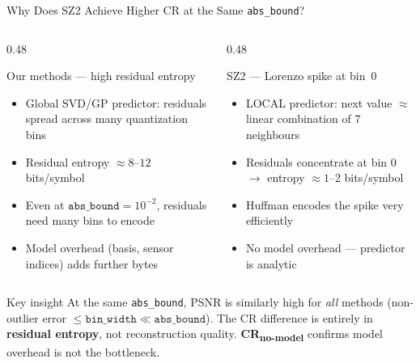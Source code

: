 \documentclass[aspectratio=169, 11pt]{beamer}
\begin{document}
\begin{frame}{Why Does SZ2 Achieve Higher CR at the Same \texttt{abs\_bound}?}
\begin{columns}[T]

\begin{column}{0.48\textwidth}
  \begingroup
  \begin{block}{Our methods — high residual entropy}
    \scriptsize
    \begin{itemize}\setlength\itemsep{0.2em}
      \item Global SVD/GP predictor: residuals spread across many quantization bins
      \item Residual entropy $\approx 8$–$12$ bits/symbol
      \item Even at $\texttt{abs\_bound}=10^{-2}$, residuals need many bins to encode
      \item Model overhead (basis, sensor indices) adds further bytes
    \end{itemize}
  \end{block}
  \endgroup
\end{column}

\begin{column}{0.48\textwidth}
  \begingroup
  \begin{block}{SZ2 — Lorenzo spike at bin~0}
    \scriptsize
    \begin{itemize}\setlength\itemsep{0.2em}
      \item LOCAL predictor: next value $\approx$ linear combination of 7 neighbours
      \item Residuals concentrate at bin 0 $\to$ entropy $\approx 1$–$2$ bits/symbol
      \item Huffman encodes the spike very efficiently
      \item No model overhead — predictor is analytic
    \end{itemize}
  \end{block}
  \endgroup
\end{column}

\end{columns}

\vspace{0.4em}
\begingroup
{}
\begin{block}{Key insight}
  \small
  At the same \texttt{abs\_bound}, PSNR is similarly high for \emph{all} methods
  (non-outlier error $\leq \texttt{bin\_width} \ll \texttt{abs\_bound}$).
  The CR difference is entirely in \textbf{residual entropy}, not reconstruction quality.
  \textbf{CR\textsubscript{no-model}} confirms model overhead is not the bottleneck.
\end{block}
\endgroup

\end{frame}
\end{document}
